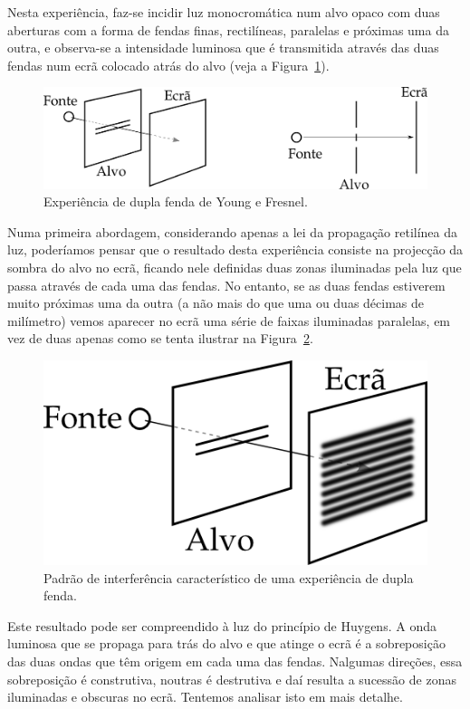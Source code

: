 Nesta experiência, faz-se incidir luz monocromática num alvo opaco com duas
aberturas com a forma de fendas finas, rectilíneas, paralelas e próximas uma da
outra, e observa-se a intensidade luminosa que é transmitida através das duas
fendas num ecrã colocado atrás do alvo (veja a Figura~\ref{fig:40-020}).
\begin{figure}[htb]
{\centering
\includegraphics{figs/f40-020.png}
\caption{Experiência de dupla fenda de Young e Fresnel.\label{fig:40-020}}

}
\end{figure}
Numa primeira abordagem, considerando apenas a lei da propagação retilínea da
luz, poderíamos pensar que o resultado desta experiência consiste na projecção
da sombra do alvo no ecrã, ficando nele definidas duas zonas iluminadas pela luz
que passa através de cada uma das fendas. No entanto, se as duas fendas
estiverem muito próximas uma da outra (a não mais do que uma ou duas décimas de
milímetro) vemos aparecer no ecrã uma série de faixas iluminadas paralelas, em
vez de duas apenas como se tenta ilustrar na Figura~\ref{fig:40-030}.
\begin{figure}[htb]
    {\centering
        \includegraphics{figs/f40-030.png}
        \caption{Padrão de interferência característico de uma experiência de
            dupla fenda.\label{fig:40-030}}

    }
\end{figure}
Este resultado pode ser compreendido à luz do princípio de Huygens. A onda
luminosa que se propaga para trás do alvo e que atinge o ecrã é a sobreposição
das duas ondas que têm origem em cada uma das fendas. Nalgumas direções, essa
sobreposição é construtiva, noutras é destrutiva e daí resulta a sucessão de
zonas iluminadas e obscuras no ecrã. Tentemos analisar isto em mais detalhe.

